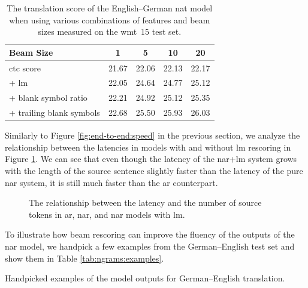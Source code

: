 \begin{table}
  \centering

  \begin{tabular}{lcccc}
    \toprule
    Beam Size &  1 &  5 &  10 &  20 \\
    \midrule
    \acs{ctc} score & 21.67 & 22.06 & 22.13 & 22.17 \\
    \quad + \acs{lm} & 22.05 & 24.64 & 24.77 & 25.12 \\
    \quad + blank symbol ratio & 22.21 & 24.92 & 25.12 & 25.35 \\
    \quad + trailing blank symbols  & 22.68 & 25.50 & 25.93 & 26.03 \\
    \bottomrule
  \end{tabular}

  \caption{The translation score of the English--German \ac{nat} model when
    using various combinations of features and beam sizes measured on the
    \acs{wmt}~15 test set.}%
  \label{tab:ngrams:features}
\end{table}

Similarly to Figure \ref{fig:end-to-end:speed} in the previous section, we
analyze the relationship between the latencies in models with and without
\ac{lm} rescoring in Figure \ref{fig:ngrams:speed}. We can see that even
though the latency of the \acs{nar}+\acs{lm} system grows with the length of
the source sentence slightly faster than the latency of the pure \acs{nar}
system, it is still much faster than the \ac{ar} counterpart.

\begin{figure}
  \centering
  

  \caption{The relationship between the latency and the number of source tokens
    in \acs{ar}, \acs{nar}, and \acs{nar} models with \acs{lm}.}%
  \label{fig:ngrams:speed}
\end{figure}

To illustrate how beam rescoring can improve the fluency of the outputs of
the \ac{nar} model, we handpick a few examples from the German--English test
set and show them in Table \ref{tab:ngrams:examples}.

\begin{table}
  \centering
  

  \caption{Handpicked examples of the model outputs for German--English
    translation.}%
  \label{tab:ngrams:examples}
\end{table}


